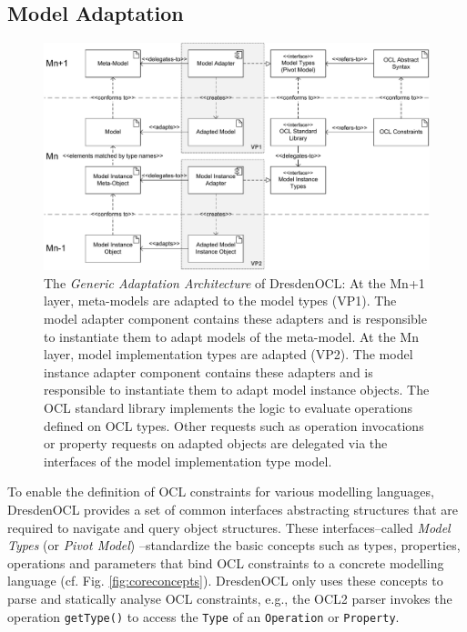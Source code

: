 \subsection{Model Adaptation}

	\begin{figure}[!t]
			\centering
				\includegraphics[width=1.00\textwidth]{figures/modeladaptation.pdf}
			\caption{The \emph{Generic Adaptation Architecture} of DresdenOCL: At the Mn+1 layer, meta-models are adapted
			to the model types (VP1). The model adapter component contains these adapters and is responsible 
			to instantiate them to adapt models of the meta-model. 
			At the Mn layer, model implementation types are adapted (VP2). The model instance adapter component
			contains these adapters and is responsible to instantiate them to adapt model instance objects. 
			The OCL standard library implements the logic to evaluate operations defined on OCL types. Other 
			requests such as operation invocations or property requests on adapted objects are delegated 
			via the interfaces of the model implementation type model.}
			\label{fig:modeladaptation}
		\end{figure}

	To enable the definition of OCL constraints for various modelling languages,
	DresdenOCL provides a set of common interfaces abstracting structures
	that are required to navigate and query object structures.
	These interfaces--called \emph{Model Types} (or \emph{Pivot Model}) \cite{braeuerOCL07}--standardize
	the basic	concepts such as types, properties, operations and parameters
	that bind OCL constraints to a concrete modelling language (cf. Fig. \ref{fig:coreconcepts}).
	DresdenOCL only	uses these concepts to parse and statically analyse OCL constraints, 
	e.g., the OCL2 parser	invokes the operation \texttt{getType()} to access the \texttt{Type} of 
	an \texttt{Operation} or \texttt{Property}.
	
